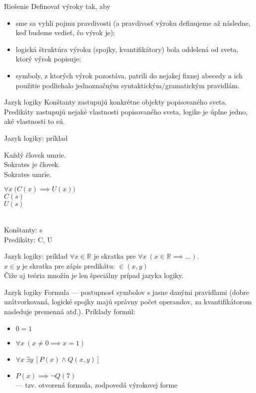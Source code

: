 \documentclass[12pt]{beamer}
\theoremstyle{definition}
\let\A\forall
\let\E\exists
\begin{document}
\begin{frame}{Riešenie}
Definovať výroky tak, aby
\begin{itemize}
\item sme sa vyhli pojmu pravdivosti (a pravdivosť výroku definujeme až následne, keď budeme vedieť, čo výrok je);
\pause
\item logická štruktúra výroku (spojky, kvantifikátory) bola oddelená od sveta, ktorý výrok popisuje;
\pause
\item symboly, z ktorých výrok pozostáva, patrili do nejakej fixnej abecedy a ich použitie podliehalo jednoznačným syntaktickým/gramatickým pravidlám.
\end{itemize}
\end{frame}

\begin{frame}{Jazyk logiky}
\alert{Konštanty} zastupujú konkrétne objekty popisovaného sveta.\\[5mm]
\pause
\alert{Predikáty} zastupujú nejaké vlastnosti popisovaného sveta, logike je úplne jedno, aké vlastnosti to sú.
\end{frame}

\begin{frame}{Jazyk logiky: príklad}
\begin{minipage}{0.5\textwidth}
Každý človek umrie.\\[2mm]
Sokrates je človek.\\[2mm]
Sokrates umrie.
\end{minipage}
\begin{minipage}{0.4\textwidth}
$\A x\ \big(C(x)\implies U(x)\big)$\\[2mm]
$C(s)$\\[2mm]
$U(s)$
\end{minipage}
\\[10mm]
Konštanty: s\\
Predikáty: C, U
\end{frame}

\begin{frame}{Jazyk logiky: príklad}
$\A x\in{\mathbb R}$ je skratka pre $\A x\ (x\in {\mathbb R}\implies \dots)$.\\[3mm]
$x\in y$ je skratka pre zápis predikátu: $\in(x, y)$\\[3mm]
Čiže aj teória množín je len špeciálny prípad jazyka logiky.
\end{frame}

\begin{frame}{Jazyk logiky}
\alert{Formula} --- postupnosť symbolov s jasne danými pravidlami (dobre uzátvorkovaná, logické spojky majú správny počet operandov, za kvantifikátorom nasleduje premenná atď.).
\pause
Príklady formúl:
\begin{itemize}
\item $0 = 1$
\item $\A x\ (x \neq 0 \implies x = 1)$
\item $\A x\ \E y\ [P(x) \land Q(x, y)]$
\item $P(x) \implies \lnot Q(7)$\\ --- tzv. otvorená formula, zodpovedá výrokovej forme
\end{itemize}
\end{frame}
\end{document}

